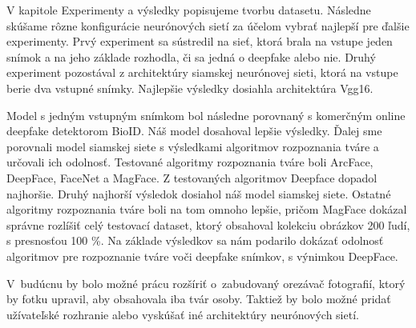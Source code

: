 V kapitole Experimenty a výsledky popisujeme tvorbu datasetu. Následne skúšame rôzne konfigurácie neurónových sietí za účelom vybrať najlepší pre ďalšie experimenty. Prvý experiment sa sústredil na sieť, ktorá brala na vstupe jeden snímok a na jeho základe rozhodla, či sa jedná o deepfake alebo nie. Druhý experiment pozostával z architektúry siamskej neurónovej sieti, ktorá na vstupe berie dva vstupné snímky. Najlepšie výsledky dosiahla architektúra Vgg16. 

Model s jedným vstupným snímkom bol následne porovnaný s komerčným online deepfake detektorom BioID. Náš model dosahoval lepšie výsledky. Ďalej sme porovnali model siamskej siete s výsledkami algoritmov rozpoznania tváre a určovali ich odolnosť. Testované algoritmy rozpoznania tváre boli ArcFace, DeepFace, FaceNet a MagFace. Z testovaných algoritmov Deepface dopadol najhoršie. Druhý najhorší výsledok dosiahol náš model siamskej siete. Ostatné algoritmy rozpoznania tváre boli na tom omnoho lepšie, pričom MagFace dokázal správne rozlíšiť celý testovací dataset, ktorý obsahoval kolekciu obrázkov 200 ľudí, s presnosťou 100 \%. Na základe výsledkov sa nám podarilo dokázať odolnosť algoritmov pre rozpoznanie tváre voči deepfake snímkov, s výnimkou DeepFace.

V~budúcnu by bolo možné prácu rozšíriť o~zabudovaný orezávač fotografií, ktorý by fotku upravil, aby obsahovala iba tvár osoby. Taktiež by bolo možné pridať užívateľské rozhranie alebo vyskúšať iné architektúry neurónových sietí.
